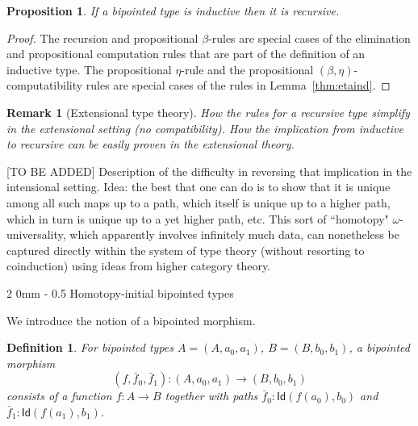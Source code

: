 \documentclass[reqno,10pt,a4paper,oneside]{amsart}
\makeatletter
\numberwithin{equation}{section}
\renewcommand{\subsection}{\@startsection
  {subsection}%
  {2}%
  {0mm}%
  {-\baselineskip}%
  {0.5\baselineskip}%
  {\normalfont\normalsize\bf}}%
\theoremstyle{mythm}
\newtheorem{proposition}[theorem]{Proposition}
\theoremstyle{mydef}
\newtheorem{definition}[theorem]{Definition}
\theoremstyle{myrmk}
\newtheorem{remark}[theorem]{Remark}
\newcommand{\co}{\colon}
\newcommand{\Id}{\mathsf{Id}}
\makeatother
\begin{document}
\begin{proposition} \label{thm:indrec}
If a bipointed type is inductive then it is recursive.
\end{proposition}


\begin{proof} The recursion and propositional $\beta$-rules are special cases of the elimination and propositional 
computation rules that are part of the definition of an inductive type. The propositional $\eta$-rule and the
propositional $(\beta, \eta)$-computatibility rules are special cases of the rules in Lemma~\ref{thm:etaind}. 
\end{proof}



\begin{remark}[Extensional type theory] How the rules for a recursive type simplify in the extensional setting (no compatibility). How
the implication from inductive to recursive can be easily proven in the extensional theory. 
\end{remark}

[TO BE ADDED]  Description of the difficulty in reversing that
implication in the intensional setting. Idea: the best that one can do is to show that it is unique among all such maps up to a path, which itself is unique up to a higher path, which in turn is unique up to a yet higher path, etc. This sort of ``homotopy" $\omega$-universality, which apparently involves infinitely much data, can nonetheless be captured directly within the system of type theory (without resorting to coinduction) using ideas from higher category theory. 


\subsection{Homotopy-initial bipointed types}



We introduce the notion of a bipointed morphism.

\begin{definition} For bipointed types $A = (A, a_0, a_1)$, $B = (B, b_0, b_1)$, a \emph{bipointed morphism} 
\[
(f, \bar{f}_0, \bar{f}_1)  \co (A, a_0, a_1)  \to (B, b_0, b_1)
\] 
consists of a function $f \co A \to B$ together with paths $\bar{f}_0 \co \Id( f(a_0), b_0)$ and~$\bar{f}_1 \co \Id(f(a_1), b_1)$.
\end{definition}
\end{document}
